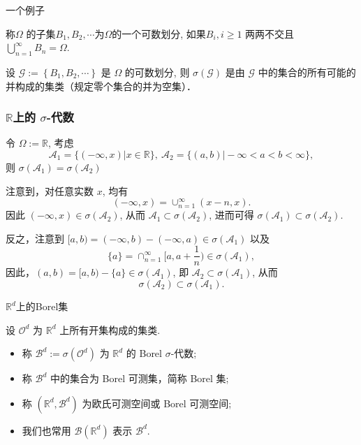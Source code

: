\documentclass[Prob-All.tex]{subfiles}
\begin{document}
\begin{frame}{一个例子}
	\pause
\begin{defi}
  称$\Omega$ 的子集$B_{1}, B_{2}, \cdots$为$\Omega$的一个可数划分, 如果$B_{i}, i\geq 1$ 两两不交且 $\bigcup_{n=1}^{\infty} B_{n}=\Omega$.
\end{defi}
\pause

\vspace{0.3cm}
	\begin{exam}
		设 $\mathcal{G}:=\left\{B_{1}, B_{2}, \cdots\right\}$ 是 $\Omega$ 的可数划分, 则 $\sigma(\mathcal{G})$ 是由 $\mathcal{G}$ 中的集合的所有可能的并构成的集类（规定零个集合的并为空集）．
	\end{exam}


\end{frame}





\begin{frame}
	\frametitle{$\mathbb{R}$上的 $\sigma$-代数}
	\begin{exam}
		令 $\Omega:=\mathbb{R}$, 考虑
		\[\mathcal{A}_1=\{(-\infty, x)|x\in\mathbb{R}\}, \  \mathcal{A}_2=\{(a, b)|-\infty<a<b<\infty\},\]
		则 $\sigma (\mathcal{A}_1)=\sigma (\mathcal{A}_2)$
	\end{exam}

	\pause
	\jieda  注意到，对任意实数 $x$, 均有
	\[(-\infty, x)=\cup_{n=1}^\infty(x-n,x).\]
	\pause 因此 $(-\infty, x)\in\sigma (\mathcal{A}_2)$, \pause 从而 $\mathcal{A}_1\subset \sigma (\mathcal{A}_2)$, \pause 进而可得 $\sigma (\mathcal{A}_1)\subset\sigma (\mathcal{A}_2)$.

	\pause 反之，注意到 $[a,b)=(-\infty, b)-(-\infty,a)\in\sigma (\mathcal{A}_1)$ 以及
	\[\{a\}=\cap_{n=1}^\infty[a,a+\dfrac{1}{n})\in\sigma(\mathcal{A}_1),\]
	\pause 因此，$(a,b)=[a,b)-\{a\}\in\sigma (\mathcal{A}_1)$, \pause 即 $\mathcal{A}_2\subset\sigma (\mathcal{A}_1)$, \pause 从而
	\[\sigma(\mathcal{A}_2)\subset \sigma(\mathcal{A}_1).\]
\end{frame}




\begin{frame}{$\mathbb{R}^d$上的Borel集}
	\begin{defi}
		设 $\mathcal{O}^d$ 为 $\mathbb{R}^d$ 上所有开集构成的集类.
		\begin{itemize}[<+-|alert@+>]
		\item 称 $\mathcal{B}^d:=\sigma(\mathcal{O}^d)$ 为 $\mathbb{R}^d$ 的 Borel $\sigma$-代数;
		\item 称 $\mathcal{B}^d$ 中的集合为 Borel 可测集，简称 Borel 集;
		\item 称 $(\mathbb{R}^d, \mathcal{B}^d)$ 为欧氏可测空间或 Borel 可测空间;
		\item 我们也常用 $\mathcal{B}(\mathbb{R}^d)$ 表示 $\mathcal{B}^d$.
		\end{itemize}


	\end{defi}


\end{frame}
\end{document}
